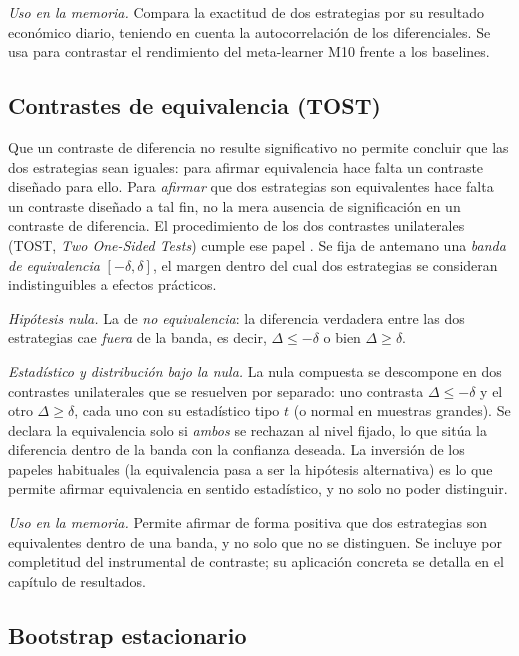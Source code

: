 \emph{Uso en la memoria.} Compara la exactitud de dos estrategias por su resultado económico diario, teniendo en cuenta la autocorrelación de los diferenciales. Se usa para contrastar el rendimiento del meta-learner M10 frente a los baselines.

\subsection{Contrastes de equivalencia (TOST)}
\label{sec:tests-tost}

Que un contraste de diferencia no resulte significativo no permite concluir que las dos estrategias sean iguales: para afirmar equivalencia hace falta un contraste diseñado para ello. Para \emph{afirmar} que dos estrategias son equivalentes hace falta un contraste diseñado a tal fin, no la mera ausencia de significación en un contraste de diferencia. El procedimiento de los dos contrastes unilaterales (TOST, \emph{Two One-Sided Tests}) cumple ese papel \cite{schuirmann1987}. Se fija de antemano una \emph{banda de equivalencia} $[-\delta, \delta]$, el margen dentro del cual dos estrategias se consideran indistinguibles a efectos prácticos.

\emph{Hipótesis nula.} La de \emph{no equivalencia}: la diferencia verdadera entre las dos estrategias cae \emph{fuera} de la banda, es decir, $\Delta \le -\delta$ o bien $\Delta \ge \delta$.

\emph{Estadístico y distribución bajo la nula.} La nula compuesta se descompone en dos contrastes unilaterales que se resuelven por separado: uno contrasta $\Delta \le -\delta$ y el otro $\Delta \ge \delta$, cada uno con su estadístico tipo $t$ (o normal en muestras grandes). Se declara la equivalencia solo si \emph{ambos} se rechazan al nivel fijado, lo que sitúa la diferencia dentro de la banda con la confianza deseada. La inversión de los papeles habituales (la equivalencia pasa a ser la hipótesis alternativa) es lo que permite afirmar equivalencia en sentido estadístico, y no solo no poder distinguir.

\emph{Uso en la memoria.} Permite afirmar de forma positiva que dos estrategias son equivalentes dentro de una banda, y no solo que no se distinguen. Se incluye por completitud del instrumental de contraste; su aplicación concreta se detalla en el capítulo de resultados.

\subsection{Bootstrap estacionario}
\label{sec:tests-bootstrap}

